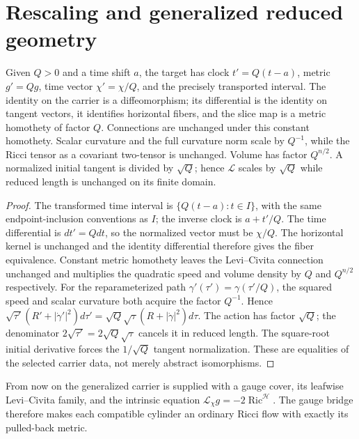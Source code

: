 \section{Rescaling and generalized reduced geometry}

\begin{theorem}
\label{thm:m13-rescaling}
Given $Q>0$ and a time shift $a$, the target has clock $t'=Q(t-a)$, metric
$g'=Qg$, time vector $\chi'=\chi/Q$, and the precisely transported interval.
The identity on the carrier is a diffeomorphism; its differential is the
identity on tangent vectors, it identifies horizontal fibers, and the slice
map is a metric homothety of factor $Q$.  Connections are unchanged under
this constant homothety.  Scalar curvature and the full curvature norm scale
by $Q^{-1}$, while
the Ricci tensor as a covariant two-tensor is unchanged.  Volume has factor
$Q^{n/2}$.  A normalized initial tangent is divided by
$\sqrt Q$; hence $\mathcal L$ scales by $\sqrt Q$ while reduced length is
unchanged on its finite domain.
\cite[Definition 3.40, p. 61]{MT2007}
\end{theorem}
\begin{proof}
The transformed time interval is $\{Q(t-a):t\in I\}$, with the same
endpoint-inclusion conventions as $I$; the inverse clock is $a+t'/Q$.
The time differential is $dt'=Qdt$, so the normalized vector must be
$\chi/Q$.  The horizontal kernel is unchanged and the identity differential
therefore gives the fiber equivalence.  Constant metric homothety leaves the
Levi--Civita connection unchanged and multiplies the quadratic speed and
volume density by $Q$ and $Q^{n/2}$ respectively.  For the reparameterized
path $\gamma'(\tau')=\gamma(\tau'/Q)$, the squared speed and scalar
curvature both acquire the factor $Q^{-1}$.  Hence
$\sqrt{\tau'}(R'+|\dot\gamma'|^2)d\tau'
=\sqrt Q\sqrt\tau(R+|\dot\gamma|^2)d\tau$.
The action has factor $\sqrt Q$; the denominator
$2\sqrt{\tau'}=2\sqrt Q\sqrt\tau$ cancels it in reduced length.  The square-root
initial derivative forces the $1/\sqrt Q$ tangent normalization.  These are
equalities of the selected carrier data, not merely abstract isomorphisms.
\end{proof}

From now on the generalized carrier is supplied with a gauge cover, its
leafwise Levi--Civita family, and the intrinsic equation
$\mathcal L_\chi g=-2\operatorname{Ric}^{\mathcal H}$.
The gauge bridge therefore makes each compatible cylinder an ordinary
Ricci flow with exactly its pulled-back metric.


